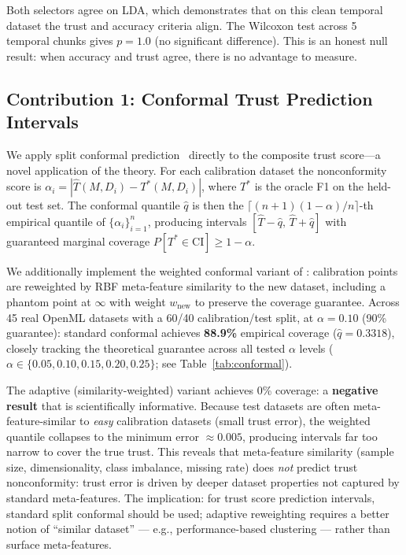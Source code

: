 \documentclass[10pt]{article}
\begin{document}
Both selectors agree on LDA, which demonstrates that on this clean temporal dataset the trust and accuracy criteria align. The Wilcoxon test across 5 temporal chunks gives $p{=}1.0$ (no significant difference). This is an honest null result: when accuracy and trust agree, there is no advantage to measure.

\subsection{Contribution 1: Conformal Trust Prediction Intervals}
\label{sec:conformal_contribution}

We apply split conformal prediction~\citep{angelopoulos2022gentle} directly to the composite trust score—a novel application of the theory. For each calibration dataset the nonconformity score is $\alpha_i = |\hat{T}(M, D_i) - T^*(M, D_i)|$, where $T^*$ is the oracle F1 on the held-out test set. The conformal quantile $\hat{q}$ is then the $\lceil(n{+}1)(1{-}\alpha)/n\rceil$-th empirical quantile of $\{\alpha_i\}_{i=1}^n$, producing intervals $[\hat{T}{-}\hat{q},\, \hat{T}{+}\hat{q}]$ with guaranteed marginal coverage $P[T^* \in \text{CI}] \geq 1-\alpha$.

We additionally implement the weighted conformal variant of \citet{tibshirani2019conformal}: calibration points are reweighted by RBF meta-feature similarity to the new dataset, including a phantom point at $\infty$ with weight $w_\text{new}$ to preserve the coverage guarantee. Across 45 real OpenML datasets with a 60/40 calibration/test split, at $\alpha{=}0.10$ (90\% guarantee): standard conformal achieves \textbf{88.9\%} empirical coverage ($\hat{q}{=}0.3318$), closely tracking the theoretical guarantee across all tested $\alpha$ levels ($\alpha \in \{0.05, 0.10, 0.15, 0.20, 0.25\}$; see Table~\ref{tab:conformal}).

The adaptive (similarity-weighted) variant achieves 0\% coverage: a \textbf{negative result} that is scientifically informative. Because test datasets are often meta-feature-similar to \emph{easy} calibration datasets (small trust error), the weighted quantile collapses to the minimum error $\approx 0.005$, producing intervals far too narrow to cover the true trust. This reveals that meta-feature similarity (sample size, dimensionality, class imbalance, missing rate) does \emph{not} predict trust nonconformity: trust error is driven by deeper dataset properties not captured by standard meta-features. The implication: for trust score prediction intervals, standard split conformal should be used; adaptive reweighting requires a better notion of ``similar dataset'' — e.g., performance-based clustering — rather than surface meta-features.
\end{document}
